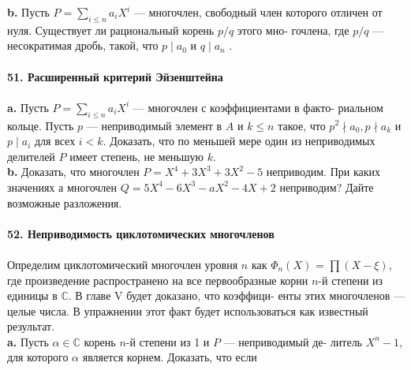 \documentclass{mai_book}
\begin{document}
\noindent\hspace*{10pt}\textbf{b.} Пусть $P=\sum_{i\leq n}a_iX^i$ — многочлен, свободный член которого\linebreak
отличен от нуля. Существует ли рациональный корень $p/q$ этого мно-\linebreak
гочлена, где $p/q$ — несократимая дробь, такой, что $p\;|\; a_0$ и $q \;|\; a_n$ .
\\
\\
\noindent\textbf{51. Расширенный критерий Эйзенштейна}\\\\
\hspace*{10pt}\textbf{a.} Пусть  $P=\sum_{i\leq n}a_iX^i$ — многочлен с коэффициентами в факто-\linebreak
риальном кольце. Пусть $p$ — неприводимый элемент в $A$ и $k\leq n$ такое,\linebreak
что  $p^2 \nmid a_0, p \nmid a_k$ и $p \;| \;a_i$ для всех $i < k$. Доказать, что по меньшей мере\linebreak
один из неприводимых делителей $P$ имеет степень, не меньшую $k$.\\
\hspace*{10pt}\textbf{b.} Доказать, что многочлен $P=X^4+3X^3+3X^2-5$ неприводим.\linebreak
При каких значениях а многочлен $Q=5X^4-6X^3-aX^2-4X+2$\linebreak
неприводим? Дайте возможные разложения.
\\
\\
\noindent\textbf{52. Неприводимость циклотомических многочленов}\\\\
\hspace*{10pt} Определим циклотомический многочлен уровня $n$ как $\Phi_n(X)$ =\linebreak
$\prod (X-\xi)$, где произведение распространено на все первообразные корни\linebreak
$n$-й степени из единицы в $\mathbb{C}$. В главе V будет доказано, что коэффици-\linebreak
енты этих многочленов — целые числа. В упражнении этот факт будет\linebreak
использоваться как известный результат.\\
\hspace*{10pt}\textbf{a.} Пусть $\alpha\in \mathbb{C}$ корень $n$-й степени из 1 и $P$ — неприводимый де-\linebreak
литель $X^n -1$, для которого $\alpha$ является корнем. Доказать, что если\linebreak
\end{document}
